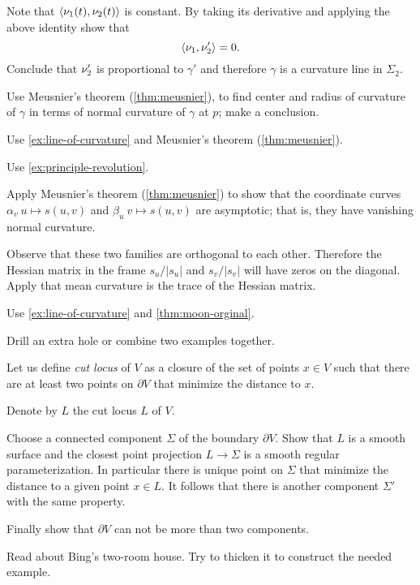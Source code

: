 Note that $\langle \nu_1(t),\nu_2(t)\rangle$ is constant.
By taking its derivative and applying the above identity show that
\[\langle\nu_1,\nu_2'\rangle=0.\]
Conclude that $\nu_2'$ is proportional to $\gamma'$
and therefore $\gamma$ is a curvature line in $\Sigma_2$.


 Use Meusnier's theorem (\ref{thm:meusnier}), to find center and radius of curvature of $\gamma$ in terms of normal curvature of $\gamma$ at $p$;
make a conclusion.

Use \ref{ex:line-of-curvature} and Meusnier's theorem (\ref{thm:meusnier}).

 Use \ref{ex:principle-revolution}.

 Apply Meusnier's theorem (\ref{thm:meusnier}) to show that the coordinate curves $\alpha_v\:u\mapsto s(u,v)$ and $\beta_u\:v\mapsto s(u,v)$ are asymptotic; that is, they have vanishing normal curvature.

{\sloppy

Observe that these two families are orthogonal to each other.
Therefore the Hessian matrix in the frame $s_u/|s_u|$ and $s_v/|s_v|$ will have zeros on the diagonal.
Apply that mean curvature is the trace of the Hessian matrix.

}

 Use \ref{ex:line-of-curvature} and \ref{thm:moon-orginal}.

 Drill an extra hole or combine two examples together.

Let us define \emph{cut locus} of $V$ as a closure of the set of points $x\in V$ such that there are at least two points on $\partial V$ that minimize the distance to $x$.

Denote by $L$ the cut locus $L$ of $V$.

Choose a connected component $\Sigma$ of the boundary $\partial V$.
Show that $L$ is a smooth surface and the closest point projection $L\to \Sigma$ is a smooth regular parameterization.
In particular there is unique point on $\Sigma$ that minimize the distance to a given point $x\in L$.
It follows that there is another component $\Sigma'$ with the same property.

Finally show that $\partial V$ can not be more than two components.

Read about Bing's two-room house.
Try to thicken it to construct the needed example.

